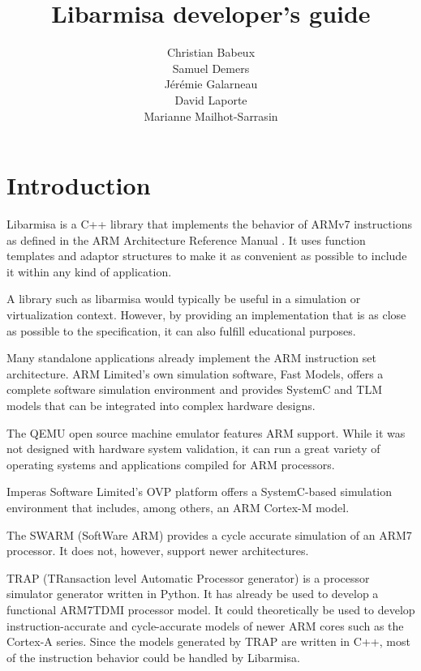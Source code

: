\documentclass[letterpaper,12pt]{article}
\author{
Christian Babeux\\
Samuel Demers\\
J\'er\'emie Galarneau\\
David Laporte\\
Marianne Mailhot-Sarrasin
}
\title{Libarmisa developer's guide}
\begin{document}
\maketitle
\tableofcontents

\newpage

\section{Introduction}
\label{sec:intro}

Libarmisa is a C++ library that implements the behavior of ARMv7
instructions as defined in the ARM Architecture Reference Manual
\cite{arm2009}. It uses function templates and adaptor structures to
make it as convenient as possible to include it within any kind of
application.

A library such as libarmisa would typically be useful in a simulation
or virtualization context. However, by providing an implementation
that is as close as possible to the specification, it can also fulfill
educational purposes.


Many standalone applications already implement the ARM instruction set
architecture. ARM Limited's own simulation software, Fast Models,
offers a complete software simulation environment and provides SystemC
and TLM models that can be integrated into complex hardware designs.

The QEMU open source machine emulator features ARM support. While it
was not designed with hardware system validation, it can run a great
variety of operating systems and applications compiled for ARM
processors.

Imperas Software Limited's OVP platform offers a SystemC-based
simulation environment that includes, among others, an ARM Cortex-M
model.

The SWARM (SoftWare ARM) provides a cycle accurate simulation of an
ARM7 processor. It does not, however, support newer architectures.

TRAP (TRansaction level Automatic Processor generator) is a
processor simulator generator written in Python. It has already be
used to develop a functional ARM7TDMI processor model. It could
theoretically be used to develop instruction-accurate and
cycle-accurate models of newer ARM cores such as the Cortex-A
series. Since the models generated by TRAP are written in C++, most of
the instruction behavior could be handled by Libarmisa.
\end{document}
